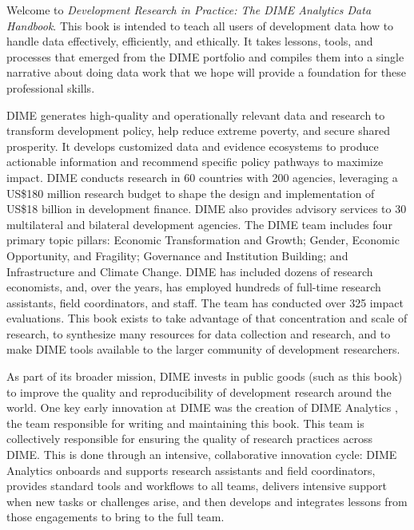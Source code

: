 \begin{fullwidth}
Welcome to \textit{Development Research in Practice: The DIME Analytics Data Handbook}.
This book is intended to teach all users of development data
how to handle data effectively, efficiently, and ethically.
It takes lessons, tools, and processes that emerged from the DIME portfolio
and compiles them into a single narrative about doing data work
that we hope will provide a foundation for these professional skills.

DIME generates high-quality and operationally relevant data and research
to transform development policy, help reduce extreme poverty, and secure shared prosperity.
It develops customized data and evidence ecosystems to produce actionable information
and recommend specific policy pathways to maximize impact.
DIME conducts research in 60 countries with 200 agencies, leveraging a
US\$180 million research budget to shape the design and implementation of
US\$18 billion in development finance.
DIME also provides advisory services to 30 multilateral and bilateral development agencies.
The DIME team includes four primary topic pillars:
Economic Transformation and Growth;
Gender, Economic Opportunity, and Fragility;
Governance and Institution Building;
and Infrastructure and Climate Change.
DIME has included dozens of research economists,
and, over the years, has employed hundreds of full-time research assistants, field coordinators, and staff.
The team has conducted over 325 impact evaluations.
This book exists to take advantage of that concentration and scale of research,
to synthesize many resources for data collection and research,
and to make DIME tools available to the larger community of development researchers.

As part of its broader mission, DIME invests in public goods (such as this book)
to improve the quality and reproducibility of development research around the world.
One key early innovation at DIME was the creation of DIME Analytics ,
the team responsible for writing and maintaining this book.
This team is collectively responsible for ensuring the quality of research practices across DIME.
This is done through an intensive, collaborative innovation cycle:
DIME Analytics onboards and supports research assistants and field coordinators,
provides standard tools and workflows to all teams,
delivers intensive support when new tasks or challenges arise,
and then develops and integrates lessons from those engagements to bring to the full team.

\end{fullwidth}

